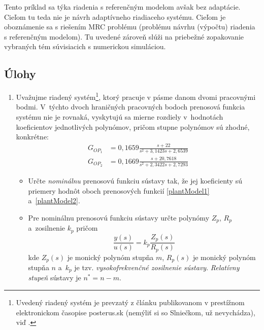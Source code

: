 \documentclass[a4paper, 10pt, ]{article}
\begin{document}
Tento príklad sa týka riadenia s referenčným modelom avšak bez adaptácie. Cieľom tu teda nie je návrh adaptívneho riadiaceho systému. Cieľom je oboznámenie sa s riešením MRC problému (problému návrhu (výpočtu) riadenia s referenčným modelom). Tu uvedené zároveň slúži na priebežné zopakovanie vybraných tém súvisiacich s numerickou simuláciou.







\subsection{Úlohy}


\begin{enumerate}[leftmargin=0pt, labelsep=4mm, itemsep=0pt]

    \item Uvažujme riadený systém\footnote{Uvedený riadený systém je prevzatý z článku publikovanom v prestížnom elektronickom časopise posterus.sk (nemýliť si so Slniečkom, už nevychádza), viď \cite{Tar11}.}, ktorý pracuje v pásme danom dvomi pracovnými bodmi. V~týchto dvoch hraničných pracovných bodoch prenosová funkcia systému nie je rovnaká, vyskytujú sa mierne rozdiely v~hodnotách koeficientov jednotlivých polynómov, pričom stupne polynómov sú zhodné, konkrétne:
    \begin{align}
    	G_{OP_1} &= 0,1659 \frac{s + 22}{ s^2 + 3,1423 s + 2,6539} 	\label{plantModel1}\\
    	G_{OP_2} &= 0,1669 \frac{s + 20,7618}{s^2 + 2,3422s + 2,7293} \label{plantModel2}
    \end{align}
    \begin{itemize}[leftmargin=0pt, labelsep=4mm, itemsep=0pt]
    	\item Určte \emph{nominálnu} prenosovú funkciu sústavy tak, že jej koeficienty sú priemery hodnôt oboch prenosových funkcií \eqref{plantModel1} a~\eqref{plantModel2}.

    	\item Pre nominálnu prenosovú funkciu sústavy určte polynómy $Z_p$, $R_p$ a~zosilnenie $k_p$ pričom
    	\begin{equation} \label{C_PFsustavy_MRCp}
    	       \frac{y(s)}{u(s)} = k_p \frac{Z_p(s)}{R_p(s)}
        \end{equation}
        kde $Z_p(s)$ je monický  polynóm stupňa $m$, $R_p(s)$ je monický polynóm stupňa $n$ a~$k_p$ je tzv. \emph{vysokofrekvenčné zosilnenie sústavy}. \emph{Relatívny stupeň} sústavy je $n^* = n - m$.


\end{itemize}
\end{enumerate}
\end{document}
